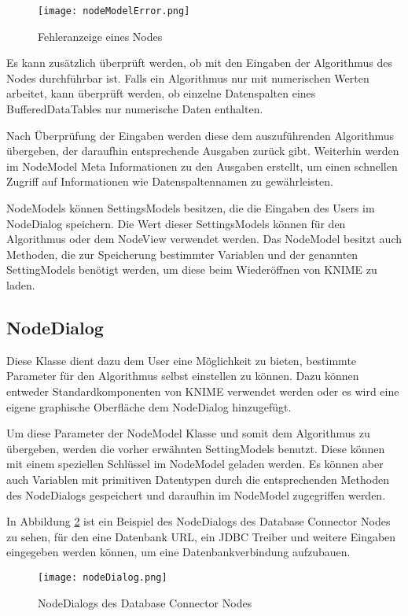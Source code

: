 \begin{figure}[H]
	\centering
	\texttt{[image: nodeModelError.png]}
	\caption{Fehleranzeige eines Nodes}
	\label{img:nodeModelError}
\end{figure}

Es kann zusätzlich überprüft werden, ob mit den Eingaben der Algorithmus des Nodes durchführbar ist. Falls ein Algorithmus nur mit numerischen Werten arbeitet, kann überprüft werden, ob einzelne Datenspalten eines BufferedDataTables nur numerische Daten enthalten.

Nach Überprüfung der Eingaben werden diese dem auszuführenden Algorithmus übergeben, der daraufhin entsprechende Ausgaben zurück gibt. Weiterhin werden im NodeModel Meta Informationen zu den Ausgaben erstellt, um einen schnellen Zugriff auf Informationen wie Datenspaltennamen zu gewährleisten.

NodeModels können SettingsModels besitzen, die die Eingaben des Users im NodeDialog speichern. Die Wert dieser SettingsModels können für den Algorithmus oder dem NodeView verwendet werden. Das NodeModel besitzt auch Methoden, die zur Speicherung bestimmter Variablen und der genannten SettingModels benötigt werden, um diese beim Wiederöffnen von KNIME zu laden.
\subsection{NodeDialog}
\label{ch:Analyse:sec:knime:subsec:nodeDialog}
Diese Klasse dient dazu dem User eine Möglichkeit zu bieten, bestimmte Parameter für den Algorithmus selbst einstellen zu können. 
Dazu können entweder Standardkomponenten von KNIME verwendet werden oder es wird eine eigene graphische Oberfläche dem NodeDialog hinzugefügt.

Um diese Parameter der NodeModel Klasse und somit dem Algorithmus zu übergeben, werden die vorher erwähnten SettingModels benutzt. Diese können mit einem speziellen Schlüssel im NodeModel geladen werden.
Es können aber auch Variablen mit primitiven Datentypen durch die entsprechenden Methoden des NodeDialogs gespeichert und daraufhin im NodeModel zugegriffen werden.

In Abbildung \ref{img:nodeDialog} ist ein Beispiel des NodeDialogs des Database Connector Nodes zu sehen, für den eine Datenbank URL, ein JDBC Treiber und weitere Eingaben eingegeben werden können, um eine Datenbankverbindung aufzubauen.

\begin{figure}[H]
	\centering
	\texttt{[image: nodeDialog.png]}
	\caption{NodeDialogs des Database Connector Nodes}
	\label{img:nodeDialog}
\end{figure}

